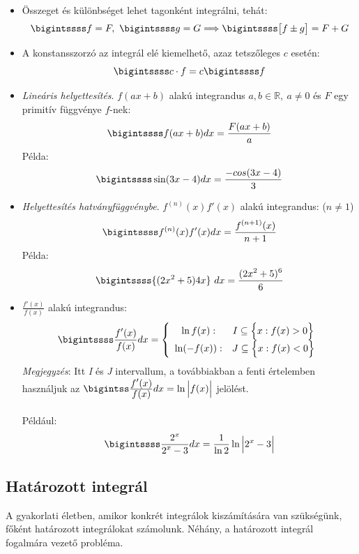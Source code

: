 \documentclass[12pt,margin=0px]{article}
\newcommand\ddfrac[2]{\frac{\displaystyle #1}{\displaystyle #2}}
\begin{document}
    \begin{itemize}
      \item Összeget és különbséget lehet tagonként integrálni, tehát:
      \[
        \bigintssss f = F,\ \bigintssss g = G \Longrightarrow \bigintssss \big[f \pm g \big] = F + G
      \]
      \item A konstansszorzó az integrál elé kiemelhető, azaz tetszőleges $c$ esetén:
      \[
        \bigintssss c \cdot f = c \bigintssss f
      \]
      \item \emph{Lineáris helyettesítés}. $f(ax + b)$ alakú integrandus $a, b \in \mathbb{R},\ a \neq 0$ és $F$ egy primitív függvénye $f$-nek:
      \[
        \bigintssss f(ax + b)dx = \ddfrac{F(ax + b)}{a}
      \]
      Példa:
      \[
        \bigintssss \sin (3x - 4)dx = \ddfrac{-cos(3x - 4)}{3}
      \]
      \item \emph{Helyettesítés hatványfüggvénybe}. $f^{(n)}(x)f'(x)$ alakú integrandus: ($n \neq 1$)
      \[
        \bigintssss f^{(n)}(x)f'(x) dx = \ddfrac{f^{(n+1)}(x)}{n+1}
      \]
      Példa:
      \[
        \bigintssss {(2x^2+5)4x}\ dx = \ddfrac{(2x^2+5)^6}{6}
      \]
      \item $\ddfrac{f'(x)}{f(x)}$ alakú integrandus:
      \[
        \bigintssss \ddfrac{f'(x)}{f(x)} dx = \left\{ \begin{array}{cc}
                                                 \ln f(x): & I \subseteq \Big\{x: f(x) > 0\Big\} \\
                                                 \ln(-f(x)): & J \subseteq  \Big\{x: f(x) < 0\Big\}
                                               \end{array}
        \right.
      \]
      \emph{Megjegyzés}: Itt \emph{I} és \emph{J} intervallum, a továbbiakban a fenti értelemben használjuk az $\bigintss \ddfrac{f'(x)}{f(x)} dx = \ln \Big|f(x)\Big|$ jelölést.\\
      \ \\
      Például:
      \[
        \bigintssss \ddfrac{2^x}{2^x-3} dx = \ddfrac{1}{\ln 2}\ln\Big|2^x-3\Big|
      \]
    \end{itemize}
				
    \subsection*{Határozott integrál}

    \noindent A gyakorlati életben, amikor konkrét integrálok kiszámítására van szükségünk, főként határozott integrálokat számolunk.
    \noindent Néhány, a határozott integrál fogalmára vezető probléma.
\end{document}
